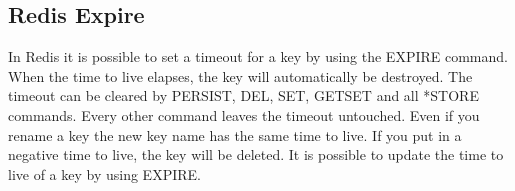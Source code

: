 \subsection{Redis Expire}
In Redis it is possible to set a timeout for a key by using the EXPIRE command. When the time to live elapses, the key will automatically be destroyed. The timeout can be cleared by PERSIST, DEL, SET, GETSET and all *STORE commands. Every other command leaves the timeout untouched. Even if you rename a key the new key name has the same time to live. If you put in a negative time to live, the key will be deleted. It is possible to update the time to live of a key by using EXPIRE. \cite{RedisExpire}
